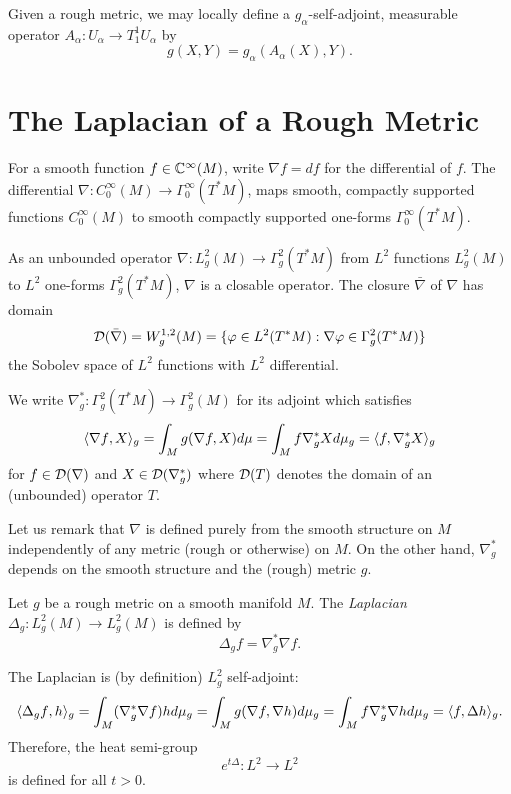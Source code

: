 \documentclass{amsart}
\begin{document}
Given a rough metric, we may locally define a \(g_{\alpha}\)-self-adjoint, measurable operator \(A_{\alpha} : U_{\alpha} \to T^1_1 U_{\alpha}\) by
\[
g(X, Y) = g_{\alpha} (A_{\alpha} (X), Y).
\]

\section{The Laplacian of a Rough Metric}

For a smooth function \(f \in \mathbb{C}^{\infty}(M)\), write \(\nabla f = df\) for the differential of \(f\). The differential \(\nabla : C^{\infty}_0(M) \to \Gamma^{\infty}_0(T^{\ast} M)\), maps smooth, compactly supported functions \(C^{\infty}_0(M)\) to smooth compactly supported one-forms \(\Gamma^{\infty}_0(T^{\ast} M)\).

As an unbounded operator \(\nabla: L^2_g (M) \to \Gamma^2_g(T^{\ast} M)\) from \(L^2\) functions \(L^2_g (M)\) to \(L^2\) one-forms \(\Gamma^2_g(T^{\ast} M)\), \(\nabla\) is a closable operator. The closure \(\bar{\nabla}\) of \(\nabla\) has domain
\[
\operatorname{\mathcal{D}}(\bar{\nabla}) = W^{1,2}_g (M) = \lbrace \varphi \in L^2 (T^{\ast} M) : \nabla \varphi \in \Gamma^2_g(T^{\ast} M) \rbrace
\]
the Sobolev space of \(L^2\) functions with \(L^2\) differential.

We write \(\nabla^{\ast}_g : \Gamma^2_g(T^{\ast} M) \to \Gamma^2_g(M)\) for its adjoint which satisfies
\[
\langle{\nabla f},{X}\rangle_{g} = \int_M g(\nabla f, X) d\mu = \int_M f \nabla^{\ast}_g X d\mu_g = \langle{f},{\nabla^{\ast}_g X}\rangle_g
\]
for \(f \in \operatorname{\mathcal{D}}(\nabla)\) and \(X \in \operatorname{\mathcal{D}}(\nabla^{\ast}_g)\) where \(\operatorname{\mathcal{D}}(T)\) denotes the domain of an (unbounded) operator \(T\).

\begin{rem}
Let us remark that \(\nabla\) is defined purely from the smooth structure on \(M\) independently of any metric (rough or otherwise) on \(M\). On the other hand, \(\nabla^{\ast}_g\) depends on the smooth structure and the (rough) metric \(g\).
\end{rem}

\begin{defn}
Let \(g\) be a rough metric on a smooth manifold \(M\). The \emph{Laplacian} \(\Delta_g : L^2_g(M) \to L^2_g(M)\) is defined by
\[
\Delta_g f = \nabla^{\ast}_g \nabla f.
\]
\end{defn}

\begin{rem}
The Laplacian is (by definition) \(L^2_g\) self-adjoint:
\[
\langle{\Delta_g f},{h}\rangle_g = \int_M (\nabla^{\ast}_g \nabla f) h d\mu_g = \int_M g(\nabla f, \nabla h) d\mu_g = \int_M f \nabla^{\ast}_g \nabla h d\mu_g = \langle{f},{\Delta h}\rangle_g.
\]
Therefore, the heat semi-group
\[
e^{t \Delta} : L^2 \to L^2
\]
is defined for all \(t > 0\).
\end{rem}
\end{document}
